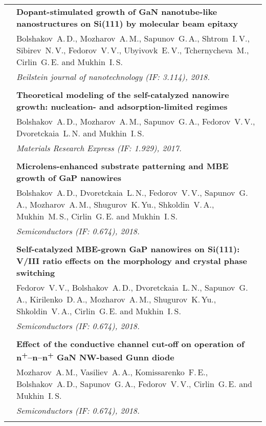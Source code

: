 \documentclass[letterpaper, 11pt]{article}
\begin{document}
\begin{longtable}{p{1.3in}p{4.8in}}
        & \textbf{Dopant-stimulated growth of GaN nanotube-like nanostructures
        on Si(111) by molecular beam epitaxy} \\
        & Bolshakov~A.\,D., Mozharov~A.\,M., Sapunov~G.\,A., Shtrom~I.\,V.,
        Sibirev~N.\,V., Fedorov~V.\,V., Ubyivovk~E.\,V., Tchernycheva~M.,
        Cirlin~G.\,E. and Mukhin~I.\,S. \\
        & \textit{Beilstein journal of nanotechnology (IF: 3.114), 2018.}\\
		& \\

		\nohyphens{\color{OliveGreen}{Q2 Publications}}
		& \textbf{Theoretical modeling of the self-catalyzed nanowire growth: nucleation- and adsorption-limited regimes} \\
		& Bolshakov~A.\,D., Mozharov~A.\,M., Sapunov~G.\,A., Fedorov~V.\,V., Dvoretckaia~L.\,N. and Mukhin~I.\,S. \\
        & \textit{Materials Research Express (IF: 1.929), 2017.}\\
		& \\

		\nohyphens{\color{OliveGreen}{Q3 Publications}}
		& \textbf{Microlens-enhanced substrate patterning and MBE growth of GaP nanowires} \\
		& Bolshakov~A.\,D., Dvoretckaia~L.\,N., Fedorov~V.\,V., Sapunov~G.\,A., Mozharov~A.\,M., Shugurov~K.\,Yu., Shkoldin~V.\,A., Mukhin~M.\,S., Cirlin~G.\,E. and Mukhin~I.\,S. \\
		& \textit{Semiconductors (IF: 0.674), 2018.}\\
		& \\

		& \textbf{Self-catalyzed MBE-grown GaP nanowires on Si(111): V/III ratio effects on the morphology and crystal phase switching} \\
		& Fedorov~V.\,V., Bolshakov~A.\,D., Dvoretckaia~L.\,N., Sapunov~G.\,A., Kirilenko~D.\,A., Mozharov~A.\,M., Shugurov~K.\,Yu., Shkoldin~V.\,A., Cirlin~G.\,E. and Mukhin~I.\,S. \\
		& \textit{Semiconductors (IF: 0.674), 2018.}\\
		& \\
		
		& \textbf{Effect of the conductive channel cut-off on operation of n\textsuperscript{+}--n--n\textsuperscript{+} GaN NW-based Gunn diode} \\
		& Mozharov~A.\,M., Vasiliev~A.\,A., Komissarenko~F.\,E., Bolshakov~A.\,D., Sapunov~G.\,A., Fedorov~V.\,V., Cirlin~G.\,E. and Mukhin~I.\,S. \\
		& \textit{Semiconductors (IF: 0.674), 2018.}\\
		& \\


\end{longtable}
\end{document}
